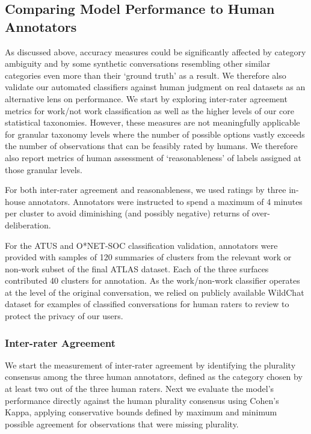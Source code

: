 \documentclass[11pt,a4paper]{article}
\begin{document}
\subsection{Comparing Model Performance to Human Annotators}
As discussed above, accuracy measures could be significantly affected by category ambiguity and by some synthetic conversations resembling other similar categories even more than their ‘ground truth’ as a result. We therefore also validate our automated classifiers against human judgment on real datasets  as an alternative lens on performance. We start by exploring inter-rater agreement metrics for work/not work classification as well as the higher levels of our core statistical taxonomies.  However, these measures are not meaningfully applicable for granular taxonomy levels where the number of possible options vastly exceeds the number of observations that can be feasibly rated by humans.  We therefore also report metrics of human assessment of ‘reasonableness’ of labels assigned at those granular levels. 

For both inter-rater agreement and reasonableness, we used ratings by three in-house annotators. Annotators were instructed to spend a maximum of 4 minutes per cluster to avoid diminishing (and possibly negative) returns of over-deliberation.

For the ATUS and O*NET-SOC classification validation, annotators were provided with samples of 120 summaries of clusters from the relevant work or non-work subset of the final ATLAS dataset. Each of the three surfaces contributed 40 clusters for annotation. As the work/non-work classifier operates at the level of the original conversation, we relied  on publicly available WildChat dataset \citep{zhao2024wildchat1mchatgptinteraction} for examples of classified conversations for human raters to review to protect the privacy of our users.

\subsubsection{Inter-rater Agreement}
We start the measurement of inter-rater agreement by  identifying the plurality consensus among the three human  annotators, defined as the category chosen by at least two out of the three human raters. Next we evaluate the model's performance directly against the human plurality consensus using Cohen's Kappa, applying conservative bounds defined by maximum and minimum possible agreement for observations that were missing plurality. 
\end{document}
